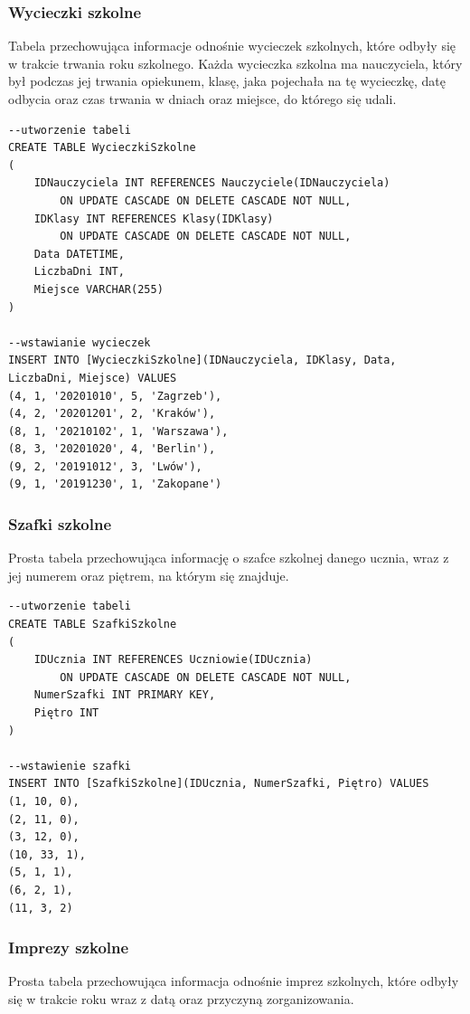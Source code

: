 \documentclass[60pt]{article}
\begin{document}
 \subsubsection{Wycieczki szkolne}
 Tabela przechowująca informacje odnośnie wycieczek szkolnych, które odbyły się w trakcie trwania roku szkolnego. Każda wycieczka szkolna ma nauczyciela, który był podczas jej trwania opiekunem, klasę, jaka pojechała na tę wycieczkę, datę odbycia oraz czas trwania w dniach oraz miejsce, do którego się udali.
\begin{verbatim}
--utworzenie tabeli
CREATE TABLE WycieczkiSzkolne
(
    IDNauczyciela INT REFERENCES Nauczyciele(IDNauczyciela) 
        ON UPDATE CASCADE ON DELETE CASCADE NOT NULL,
    IDKlasy INT REFERENCES Klasy(IDKlasy) 
        ON UPDATE CASCADE ON DELETE CASCADE NOT NULL,
    Data DATETIME,
    LiczbaDni INT,
    Miejsce VARCHAR(255)
)

--wstawianie wycieczek
INSERT INTO [WycieczkiSzkolne](IDNauczyciela, IDKlasy, Data, LiczbaDni, Miejsce) VALUES
(4, 1, '20201010', 5, 'Zagrzeb'),
(4, 2, '20201201', 2, 'Kraków'),
(8, 1, '20210102', 1, 'Warszawa'),
(8, 3, '20201020', 4, 'Berlin'),
(9, 2, '20191012', 3, 'Lwów'),
(9, 1, '20191230', 1, 'Zakopane')
\end{verbatim}

 \subsubsection{Szafki szkolne}
 Prosta tabela przechowująca informację o szafce szkolnej danego ucznia, wraz z jej numerem oraz piętrem, na którym się znajduje.

\begin{verbatim}
--utworzenie tabeli
CREATE TABLE SzafkiSzkolne
(
    IDUcznia INT REFERENCES Uczniowie(IDUcznia) 
        ON UPDATE CASCADE ON DELETE CASCADE NOT NULL,
    NumerSzafki INT PRIMARY KEY,
    Piętro INT
)

--wstawienie szafki
INSERT INTO [SzafkiSzkolne](IDUcznia, NumerSzafki, Piętro) VALUES
(1, 10, 0),
(2, 11, 0),
(3, 12, 0),
(10, 33, 1),
(5, 1, 1),
(6, 2, 1),
(11, 3, 2)
\end{verbatim}

 \subsubsection{Imprezy szkolne}
Prosta tabela przechowująca informacja odnośnie imprez szkolnych, które odbyły się w trakcie roku wraz z datą oraz przyczyną zorganizowania.
\end{document}

